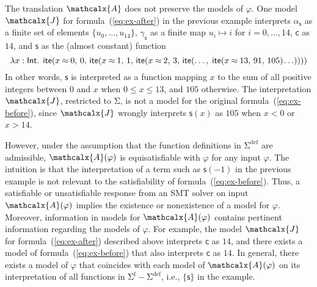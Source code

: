 \documentclass[runningheads,a4paper]{llncs}
\newcommand{\con}[1]{\mathsf{#1}}
\let\const=\con
\let\oldSigma=\Sigma
\def\Sigma{\mathrm{\oldSigma}}
\newcommand{\teq}{\approx}
\newcommand{\I}{\mathcalx{J}} %
\newcommand{\conv}{\mathcalx{A}}
\newcommand{\sfuns}[1]{#1^\mathrm{f}}
\newcommand{\sfundefs}[1]{#1^\mathrm{def}}
\newcommand{\sortint}{\ty{Int}}
\newcommand\ty[1]{\con{#1}}
\newcommand{\lite}{\con{ite}}
\newcommand\concret{\gamma} %
\newcommand{\farg}[1]{\concret_{#1}}
\newcommand{\fargsort}[1]{\alpha_{#1}}
\newcommand{\negvthinspace}{\kern-0.083333em}
\begin{document}
The translation $\conv$ does not preserve the models of $\varphi$.
One model $\I$ for formula~(\ref{eq:ex-after}) in the previous example interprets
$\fargsort{\con{s}}$ as a finite set of elements $\{ u_0, \ldots, u_{14} \}$,
$\farg{\con{s}}$ as a finite map $u_i \mapsto i$ for $i = 0, \ldots, 14$,
$\con{c}$ as $14$,
and $\con{s}$ as the (almost constant) function
%
\begin{equation} \label{eq:approx-interp}
\lambda x : \sortint.\;\, \lite( x \mathbin{\teq} 0,\, 0,\,
  \lite( x \mathbin{\teq} 1,\, 1,\,
    \lite( x \mathbin{\teq} 2,\, 3,\,
      \lite(\ldots,\; \lite( x \mathbin{\teq} 13,\, 91,\, 105 )\negvthinspace \ldots ))))
\end{equation}
%
In other words, $\const{s}$ is interpreted as a function mapping $x$ to the sum
of all positive integers between $0$ and $x$ when $0 \leq x \leq 13$, and $105$
otherwise.
The interpretation $\I$, restricted to $\Sigma$, is {not} a model for the original formula~(\ref{eq:ex-before}),
since $\I$ wrongly interprets $\con{s}( x )$ as $105$ when $x < 0$ or $x > 14$.

However, under the assumption that the function definitions in
$\sfundefs{\Sigma}$ are admissible, %
$\conv(\varphi)$ is
equisatisfiable with $\varphi$ for any input $\varphi$. The intuition is that the
interpretation of a term such as $\con{s}( -1 )$ in the previous example is not
relevant to the satisfiability of formula~(\ref{eq:ex-before}). Thus, a
satisfiable or unsatisfiable response from an SMT solver on input $\conv(
\varphi )$ implies the existence or nonexistence of a model for
$\varphi$. Moreover, information in models for $\conv( \varphi )$ contains
pertinent information regarding the models of $\varphi$. For example, the model
$\I$ for formula~(\ref{eq:ex-after}) described above interprets $\con{c}$ as $14$,
and there exists a model of formula~(\ref{eq:ex-before}) that also interprets $\con{c}$
as $14$. In general, there exists a model of $\varphi$ that
coincides with each model of $\conv( \varphi )$ on its interpretation of all
functions in $\sfuns{\Sigma} - \sfundefs{\Sigma}$, i.e., $\{
\con{s} \}$ in the example.

%
\end{document}
